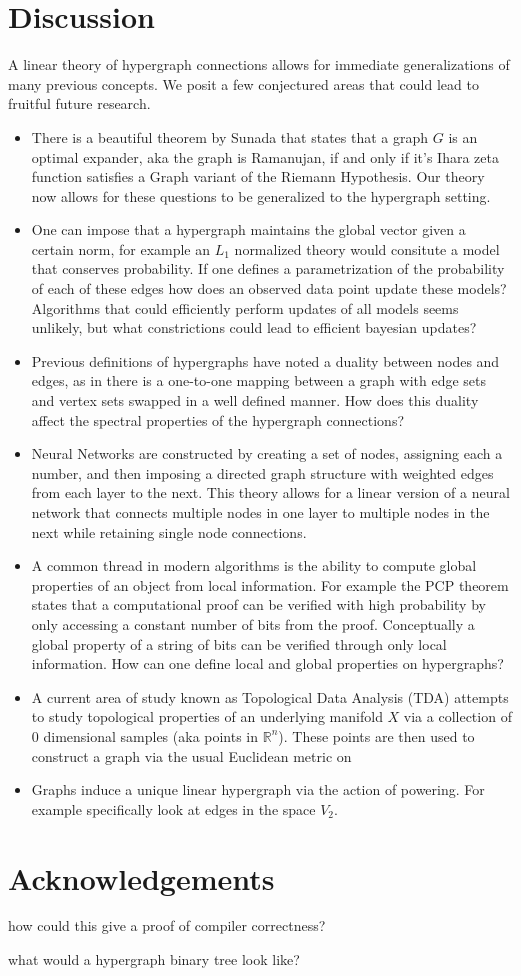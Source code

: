 \documentclass{article}
\begin{document}
\section{Discussion}
A linear theory of hypergraph connections allows for immediate generalizations of many previous concepts. We posit a few conjectured areas that could lead to fruitful future research.
\begin{itemize}
    \item There is a beautiful theorem by Sunada that states that a graph $G$ is an optimal expander, aka the graph is Ramanujan, if and only if it's Ihara zeta function satisfies a Graph variant of the Riemann Hypothesis. Our theory now allows for these questions to be generalized to the hypergraph setting.
    \item One can impose that a hypergraph maintains the global vector given a certain norm, for example an $L_1$ normalized theory would consitute a model that conserves probability. If one defines a parametrization of the probability of each of these edges how does an observed data point update these models? Algorithms that could efficiently perform updates of all models seems unlikely, but what constrictions could lead to efficient bayesian updates?
    \item Previous definitions of hypergraphs have noted a duality between nodes and edges, as in there is a one-to-one mapping between a graph with edge sets and vertex sets swapped in a well defined manner. How does this duality affect the spectral properties of the hypergraph connections?
    \item Neural Networks are constructed by creating a set of nodes, assigning each a number, and then imposing a directed graph structure with weighted edges from each layer to the next. This theory allows for a linear version of a neural network that connects multiple nodes in one layer to multiple nodes in the next while retaining single node connections.
    \item A common thread in modern algorithms is the ability to compute global properties of an object from local information. For example the PCP theorem states that a computational proof can be verified with high probability by only accessing a constant number of bits from the proof. Conceptually a global property of a string of bits can be verified through only local information. How can one define local and global properties on hypergraphs?
    \item  A current area of study known as Topological Data Analysis (TDA) attempts to study topological properties of an underlying manifold $X$ via a collection of 0 dimensional samples (aka points in $\mathbb{R}^n$). These points are then used to construct a graph via the usual Euclidean metric on
    \item Graphs induce a unique linear hypergraph via the action of powering. For example specifically look at edges in the space $V_2$.  
\end{itemize}

\section*{Acknowledgements}

how could this give a proof of compiler correctness?

what would a hypergraph binary tree look like?
\end{document}
